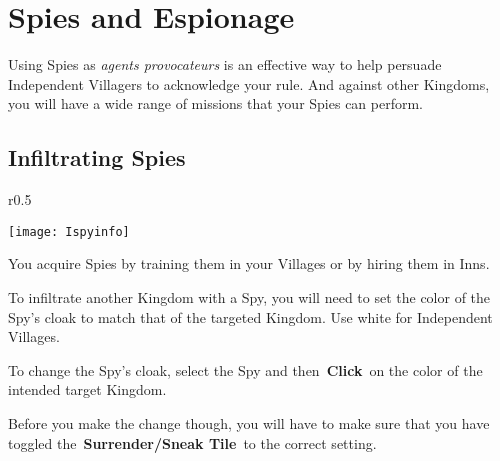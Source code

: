 
\chapter{Spies and Espionage}


Using Spies as \textit{agents provocateurs} is an effective way to help persuade Independent Villagers to acknowledge your rule. And against other Kingdoms, you will have a wide range of missions that your Spies can perform.

\section{Infiltrating Spies}

\begin{wrapfigure}{r}{0.5\textwidth}
	\vspace{-20pt}
	\begin{center}
		\texttt{[image: Ispyinfo]}
	\end{center}
	\vspace{-20pt}
\end{wrapfigure}

You acquire Spies by training them in your Villages or by hiring them in Inns.

To infiltrate another Kingdom with a Spy, you will need to set the color of the Spy’s cloak to match that of the targeted Kingdom. Use white for Independent Villages.

To change the Spy’s cloak, select the Spy and then \textbf{Click} on the color of the intended target Kingdom.

Before you make the change though, you will have to make sure that you have toggled the \textbf{Surrender/Sneak Tile} to the correct setting.

